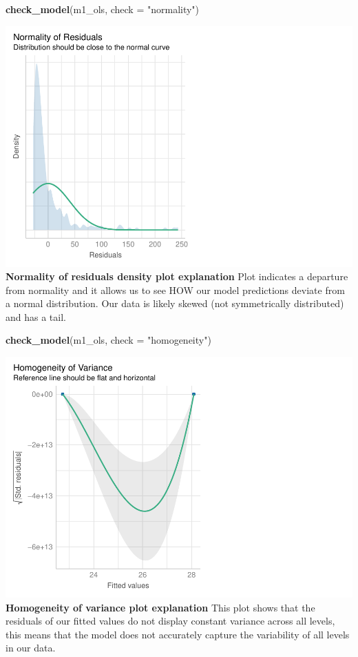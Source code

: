\documentclass[
]{article}
\newenvironment{Shaded}{\begin{snugshade}}{\end{snugshade}}
\newcommand{\AttributeTok}[1]{\textcolor[rgb]{0.13,0.29,0.53}{#1}}
\newcommand{\FunctionTok}[1]{\textcolor[rgb]{0.13,0.29,0.53}{\textbf{#1}}}
\newcommand{\NormalTok}[1]{#1}
\newcommand{\StringTok}[1]{\textcolor[rgb]{0.31,0.60,0.02}{#1}}
\begin{document}
\begin{Shaded}
\begin{Highlighting}[]
\FunctionTok{check\_model}\NormalTok{(m1\_ols, }\AttributeTok{check =} \StringTok{"normality"}\NormalTok{)}
\end{Highlighting}
\end{Shaded}

\includegraphics{hw1-lobstrs-eds241_files/figure-latex/unnamed-chunk-15-1.pdf}
\textbf{Normality of residuals density plot explanation} Plot indicates
a departure from normality and it allows us to see HOW our model
predictions deviate from a normal distribution. Our data is likely
skewed (not symmetrically distributed) and has a tail.

\begin{Shaded}
\begin{Highlighting}[]
\FunctionTok{check\_model}\NormalTok{(m1\_ols, }\AttributeTok{check =} \StringTok{"homogeneity"}\NormalTok{)}
\end{Highlighting}
\end{Shaded}

\includegraphics{hw1-lobstrs-eds241_files/figure-latex/unnamed-chunk-16-1.pdf}
\textbf{Homogeneity of variance plot explanation} This plot shows that
the residuals of our fitted values do not display constant variance
across all levels, this means that the model does not accurately capture
the variability of all levels in our data.
\end{document}
